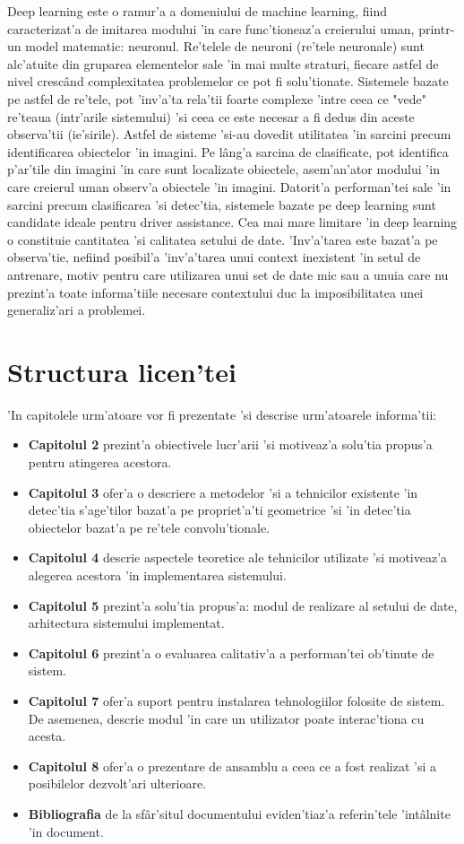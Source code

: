 \documentclass[12pt,a4paper,twoside]{report}
\begin{document}
Deep learning este o ramur'a a domeniului de machine learning, fiind caracterizat'a de imitarea modului 'in care func'tioneaz'a creierului uman, printr-un model matematic: neuronul. Re'telele de neuroni (re'tele neuronale) sunt alc'atuite din gruparea elementelor sale 'in mai multe straturi, fiecare astfel de nivel cresc\^and complexitatea problemelor ce pot fi solu'tionate. Sistemele bazate pe astfel de re'tele, pot 'inv'a'ta rela'tii foarte complexe 'intre ceea ce "vede" re'teaua (intr'arile sistemului) 'si ceea ce este necesar a fi dedus din aceste observa'tii (ie'sirile). Astfel de sisteme 'si-au dovedit utilitatea 'in sarcini precum identificarea obiectelor 'in imagini. Pe l\^ang'a sarcina de clasificate, pot identifica p'ar'tile din imagini 'in care sunt localizate obiectele, asem'an'ator modului 'in care creierul uman observ'a obiectele 'in imagini. Datorit'a performan'tei sale 'in sarcini precum clasificarea 'si detec'tia, sistemele bazate pe deep learning sunt candidate ideale pentru driver assistance. Cea mai mare limitare 'in deep learning o constituie cantitatea 'si calitatea setului de date. 'Inv'a'tarea este bazat'a pe observa'tie,  nefiind posibil'a 'inv'a'tarea unui context inexistent 'in setul de antrenare, motiv pentru care utilizarea unui set de date mic sau a unuia care nu prezint'a toate informa'tiile necesare contextului duc la imposibilitatea unei generaliz'ari a problemei. 

\newpage
\section{Structura licen'tei}
'In capitolele urm'atoare vor fi prezentate 'si descrise urm'atoarele informa'tii:
\begin{itemize}
\item \textbf{Capitolul 2} prezint'a obiectivele lucr'arii 'si motiveaz'a solu'tia propus'a pentru atingerea acestora.
\item \textbf{Capitolul 3} ofer'a o descriere a metodelor 
'si a tehnicilor existente 'in detec'tia s'age'tilor bazat'a pe propriet'a'ti geometrice 'si 'in detec'tia obiectelor bazat'a pe re'tele convolu'tionale.
\item \textbf{Capitolul 4} descrie aspectele teoretice ale tehnicilor utilizate 'si motiveaz'a alegerea acestora 'in implementarea sistemului.
\item \textbf{Capitolul 5} prezint'a solu'tia propus'a: modul de realizare al setului de date, arhitectura sistemului implementat.
\item \textbf{Capitolul 6} prezint'a o evaluarea calitativ'a a performan'tei ob'tinute de sistem.
\item \textbf{Capitolul 7} ofer'a suport pentru instalarea tehnologiilor folosite de sistem. De asemenea, descrie modul 'in care un utilizator poate interac'tiona cu acesta.
\item \textbf{Capitolul 8} ofer'a o prezentare de ansamblu a ceea ce a fost realizat 'si a posibilelor dezvolt'ari ulterioare.
\item \textbf{Bibliografia} de la sf\^ar'situl documentului eviden'tiaz'a referin'tele 'int\^alnite 'in document.
\end{itemize}
\end{document}
